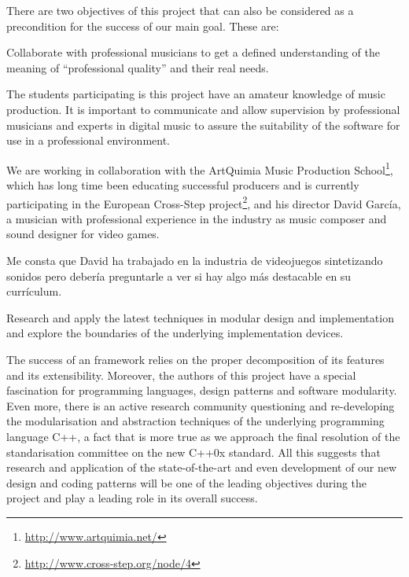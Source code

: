 There are two objectives of this project that can also be considered
as a precondition for the success of our main goal. These are:

\begin{objective} \label{obj:artquimia}
Collaborate with professional musicians to get a
defined understanding of the meaning of ``professional quality'' and
their real needs.
\end{objective}

The students participating is this project have an amateur knowledge of
music production. It is important to communicate and allow supervision
by professional musicians and experts in digital music to assure the
suitability of the software for use in a professional environment.

We are working in collaboration with the ArtQuimia Music Production
School\footnote{\url{http://www.artquimia.net/}}, which has long time
been educating successful producers and is currently participating in
the European Cross-Step
project\footnote{\url{http://www.cross-step.org/node/4}}, and his
director David García, a musician with professional experience in the
industry as music composer and sound designer for video games.

\begin{todo}
Me consta que David ha trabajado en la industria de videojuegos
sintetizando sonidos pero debería preguntarle a ver si hay algo más
destacable en su currículum.
\end{todo}

\begin{objective}
  Research and apply the latest techniques in modular design and
  implementation and explore the boundaries of the underlying
  implementation devices.
\end{objective}

The success of an framework relies on the proper decomposition of its
features and its extensibility. Moreover, the authors of this project
have a special fascination for programming languages, design patterns
and software modularity. Even more, there is an active research
community questioning and re-developing the modularisation and
abstraction techniques of the underlying programming language C++,
a fact that is more true as we approach the final resolution of the
standarisation committee on the new C++0x standard. All this suggests
that research and application of the state-of-the-art and even
development of our new design and coding patterns will be one of the
leading objectives during the project and play a leading role in
its overall success.

